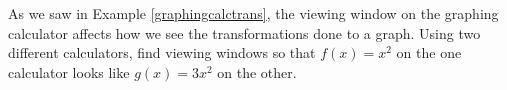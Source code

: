 {As we saw in Example \ref{graphingcalctrans}, the viewing window on the graphing calculator affects how we see the transformations done to a graph.  Using two different calculators, find viewing windows so that $f(x) = x^{2}$ on the one calculator looks like $g(x) = 3x^{2}$ on the other.}
{}